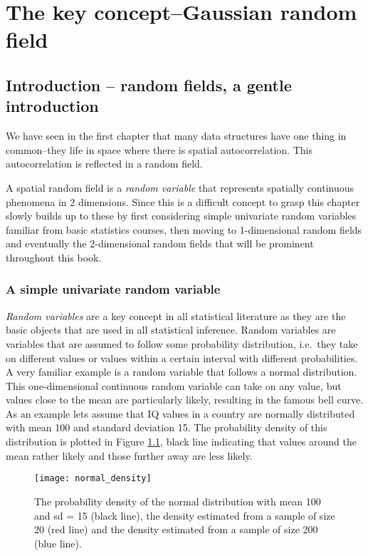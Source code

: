 \chapter{The key concept--Gaussian random field}

\section{Introduction -- random fields, a gentle introduction}
We have seen in the first chapter that many data structures have one thing in common--they life in space where there is spatial autocorrelation. This autocorrelation is reflected in a random field.

A spatial random field is a \textit{random variable} that represents spatially continuous phenomena in 2 dimensions. Since this is a difficult concept to grasp this chapter slowly builds up to these by first considering simple univariate random variables familiar from basic statistics courses, then moving to 1-dimensional random fields and eventually the 2-dimensional random fields that will be prominent throughout this book.


\subsection{A simple univariate random variable}

\textit{Random variables} are a key concept in all statistical literature as they are the basic objects that are used in all statistical inference. Random variables are variables that are assumed to follow some probability distribution, i.e.\ they take on different values or values within a certain interval with different probabilities. 
A very familiar example is a random variable that follows a normal distribution. This one-dimensional continuous random variable can take on any value, but values close to the mean are particularly likely, resulting in the famous bell curve. As an example lets assume that IQ values in a country are normally distributed with mean 100 and standard deviation 15. The probability density of this distribution is plotted in Figure \ref{fig:ch2:normal}, black line indicating that values around the mean rather likely and those further away are less likely. 

\begin{figure}
\centering
\texttt{[image: normal\_density]}
\caption{\label{fig:ch2:normal} The probability density of the normal distribution with mean 100 and sd = 15 (black line), the density estimated from a sample of size 20 (red line) and the density estimated from a sample of size 200 (blue line). }
\end{figure}


